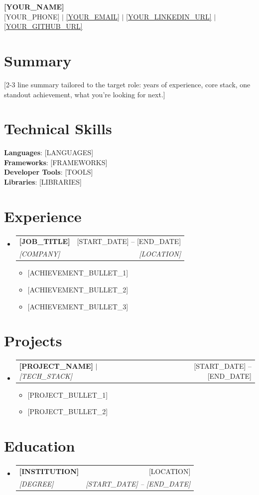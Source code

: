 \documentclass[letterpaper,11pt]{article}
\makeatletter
\newcommand{\resumeItem}[1]{
  \item\small{
    {#1 \vspace{-2pt}}
  }
}
\newcommand{\resumeSubheading}[4]{
  \vspace{-2pt}\item
    \begin{tabular*}{0.97\textwidth}[t]{l@{\extracolsep{\fill}}r}
      \textbf{#1} & #2 \\
      \textit{\small#3} & \textit{\small #4} \\
    \end{tabular*}\vspace{-7pt}
}
\newcommand{\resumeProjectHeading}[2]{
    \item
    \begin{tabular*}{0.97\textwidth}{l@{\extracolsep{\fill}}r}
      \small#1 & #2 \\
    \end{tabular*}\vspace{-7pt}
}
\newcommand{\resumeSubHeadingListStart}{\begin{itemize}[leftmargin=0.15in, label={}]}
\newcommand{\resumeSubHeadingListEnd}{\end{itemize}}
\newcommand{\resumeItemListStart}{\begin{itemize}}
\newcommand{\resumeItemListEnd}{\end{itemize}\vspace{-5pt}}
\makeatother
\begin{document}
\begin{center}
    \textbf{\Huge \scshape [YOUR_NAME]} \\ \vspace{1pt}
    \small [YOUR_PHONE] $|$ \href{mailto:[YOUR_EMAIL]}{\underline{[YOUR_EMAIL]}} $|$
    \href{[YOUR_LINKEDIN_URL]}{\underline{[YOUR_LINKEDIN_URL]}} $|$
    \href{[YOUR_GITHUB_URL]}{\underline{[YOUR_GITHUB_URL]}}
\end{center}


\section{Summary}
 \small{[2-3 line summary tailored to the target role: years of experience, core stack, one standout achievement, what you're looking for next.]}


\section{Technical Skills}
 \begin{itemize}[leftmargin=0.15in, label={}]
    \small{\item{
     \textbf{Languages}{: [LANGUAGES]} \\
     \textbf{Frameworks}{: [FRAMEWORKS]} \\
     \textbf{Developer Tools}{: [TOOLS]} \\
     \textbf{Libraries}{: [LIBRARIES]}
    }}
 \end{itemize}


\section{Experience}
  \resumeSubHeadingListStart

    \resumeSubheading
      {[JOB_TITLE]}{[START_DATE] -- [END_DATE]}
      {[COMPANY]}{[LOCATION]}
      \resumeItemListStart
        \resumeItem{[ACHIEVEMENT_BULLET_1]}
        \resumeItem{[ACHIEVEMENT_BULLET_2]}
        \resumeItem{[ACHIEVEMENT_BULLET_3]}
      \resumeItemListEnd

  \resumeSubHeadingListEnd


\section{Projects}
    \resumeSubHeadingListStart
      \resumeProjectHeading
          {\textbf{[PROJECT_NAME]} $|$ \emph{[TECH_STACK]}}{[START_DATE] -- [END_DATE]}
          \resumeItemListStart
            \resumeItem{[PROJECT_BULLET_1]}
            \resumeItem{[PROJECT_BULLET_2]}
          \resumeItemListEnd
    \resumeSubHeadingListEnd


\section{Education}
  \resumeSubHeadingListStart
    \resumeSubheading
      {[INSTITUTION]}{[LOCATION]}
      {[DEGREE]}{[START_DATE] -- [END_DATE]}
  \resumeSubHeadingListEnd


\end{document}
